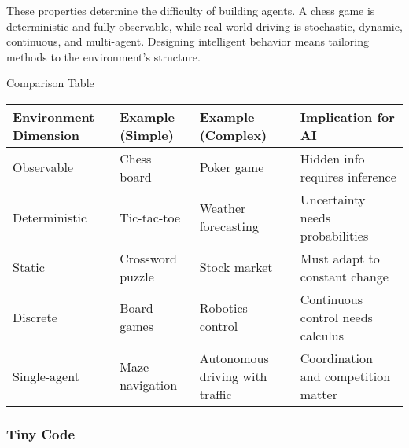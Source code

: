 \documentclass[
  letterpaper,
  DIV=11,
  numbers=noendperiod]{scrreprt}
\begin{document}
These properties determine the difficulty of building agents. A chess
game is deterministic and fully observable, while real-world driving is
stochastic, dynamic, continuous, and multi-agent. Designing intelligent
behavior means tailoring methods to the environment's structure.

Comparison Table

\begin{longtable}[]{@{}
  >{\raggedright\arraybackslash}p{}
  >{\raggedright\arraybackslash}p{}
  >{\raggedright\arraybackslash}p{}
  >{\raggedright\arraybackslash}p{}@{}}
\toprule\noalign{}
\begin{minipage}[b]{\linewidth}\raggedright
Environment Dimension
\end{minipage} & \begin{minipage}[b]{\linewidth}\raggedright
Example (Simple)
\end{minipage} & \begin{minipage}[b]{\linewidth}\raggedright
Example (Complex)
\end{minipage} & \begin{minipage}[b]{\linewidth}\raggedright
Implication for AI
\end{minipage} \\
\midrule\noalign{}
\endhead
\bottomrule\noalign{}
\endlastfoot
Observable & Chess board & Poker game & Hidden info requires
inference \\
Deterministic & Tic-tac-toe & Weather forecasting & Uncertainty needs
probabilities \\
Static & Crossword puzzle & Stock market & Must adapt to constant
change \\
Discrete & Board games & Robotics control & Continuous control needs
calculus \\
Single-agent & Maze navigation & Autonomous driving with traffic &
Coordination and competition matter \\
\end{longtable}

\subsubsection{Tiny Code}\label{tiny-code-2}
\end{document}
